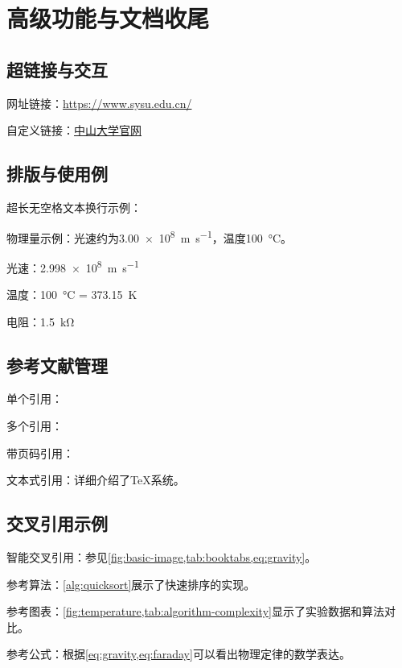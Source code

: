 \documentclass[../main]{subfiles}
\begin{document}
\section{高级功能与文档收尾}

\subsection{超链接与交互}
网址链接：\url{https://www.sysu.edu.cn/}

自定义链接：\href{https://www.sysu.edu.cn/}{中山大学官网}

\subsection{排版与使用例}
超长无空格文本换行示例：

物理量示例：光速约为\SI{3.00e8}{\meter\per\second}，温度\SI{100}{\degreeCelsius}。

光速：\SI{2.998e8}{\meter\per\second}

温度：\SI{100}{\degreeCelsius} = \SI{373.15}{\kelvin}

电阻：\SI{1.5}{\kilo\ohm}

\subsection{参考文献管理}
单个引用：\autocite{knuth1986texbook}

多个引用：\autocite{vaswani2017attention,brown2020language}

带页码引用：\autocite[第35页]{wang2010zhongwen}

文本式引用：\textcite{knuth1986texbook}详细介绍了TeX系统。

\subsection{交叉引用示例}
智能交叉引用：参见\cref{fig:basic-image,tab:booktabs,eq:gravity}。

参考算法：\cref{alg:quicksort}展示了快速排序的实现。

参考图表：\cref{fig:temperature,tab:algorithm-complexity}显示了实验数据和算法对比。

参考公式：根据\cref{eq:gravity,eq:faraday}可以看出物理定律的数学表达。
\end{document}
